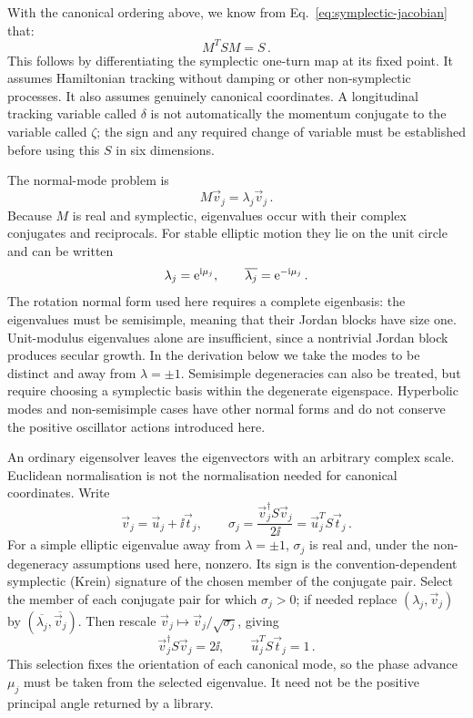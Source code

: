 With the canonical ordering above, we know from
Eq.~\eqref{eq:symplectic-jacobian} that:
\begin{equation}\label{eq:lnf-symplectic-matrix}
    M^T S M = S\,.
\end{equation}
This follows by differentiating the symplectic one-turn map
at its fixed point. It assumes Hamiltonian tracking without damping or
other non-symplectic processes. It also assumes genuinely canonical
coordinates. A longitudinal tracking variable called $\delta$ is not
automatically the momentum conjugate to the variable called $\zeta$;
the sign and any required change of variable must be established before
using this $S$ in six dimensions.

The normal-mode problem is
\begin{equation}\label{eq:lnf-eigenvalue}
    M\vec v_j = \lambda_j\vec v_j\,.
\end{equation}
Because $M$ is real and symplectic, eigenvalues occur with their complex
conjugates and reciprocals. For stable elliptic motion they lie on the
unit circle and can be written
\begin{equation}
    \lambda_j = \mathrm{e}^{\mathrm{i}\mu_j},\qquad
    \overline{\lambda_j} = \mathrm{e}^{-\mathrm{i}\mu_j}\,.
\end{equation}
The rotation normal form used here requires a complete eigenbasis:
the eigenvalues must be semisimple, meaning that their Jordan blocks have
size one. Unit-modulus eigenvalues alone are insufficient, since a
nontrivial Jordan block produces secular growth. In the derivation below
we take the modes to be distinct and away from $\lambda = \pm1$.
Semisimple degeneracies can also be treated, but require choosing a
symplectic basis within the degenerate eigenspace. Hyperbolic modes and
non-semisimple cases have other normal forms and do not conserve the
positive oscillator actions introduced here.

An ordinary eigensolver leaves the eigenvectors with an arbitrary complex
scale. Euclidean normalisation is not the normalisation needed for
canonical coordinates. Write
\begin{equation}
    \vec v_j = \vec u_j + \ii\vec t_j,
    \qquad
    \sigma_j = \frac{\vec v_j^\dagger S\vec v_j}{2\ii} = \vec u_j^T S\vec t_j\,.
\end{equation}
For a simple elliptic eigenvalue away from $\lambda = \pm 1$, $\sigma_j$ is
real and, under the non-degeneracy assumptions used here, nonzero.  Its sign is the convention-dependent symplectic (Krein) signature of the
chosen member of the conjugate pair. Select the
member of each conjugate pair for which $\sigma_j>0$; if needed replace
$(\lambda_j,\vec v_j)$ by
$(\overline{\lambda_j},\overline{\vec v_j})$. Then rescale
$\vec v_j\mapsto\vec v_j/\sqrt{\sigma_j}$, giving
\begin{equation}\label{eq:lnf-eigenvector-normalisation}
    \vec v_j^\dagger S\vec v_j = 2\ii,
    \qquad \vec u_j^T S\vec t_j = 1\,.
\end{equation}
This selection fixes the orientation of each canonical mode, so the
phase advance $\mu_j$ must be taken from the selected eigenvalue.
It need not be the positive principal angle returned by a library.


